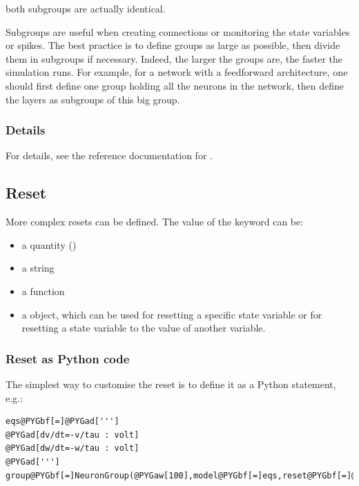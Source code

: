 \documentclass[letterpaper,10pt,english]{manual}
\begin{document}
both subgroups are actually identical.

Subgroups are useful when creating connections or monitoring the state variables or spikes.
The best practice is to define groups as large as possible, then divide them in subgroups if necessary.
Indeed, the larger the groups are, the faster the simulation runs. For example, for a network with a feedforward
architecture, one should first define one group holding all the neurons in the network, then define the layers as
subgroups of this big group.


\subsubsection{Details}

For details, see the reference documentation for \hyperlink{brian.NeuronGroup}{}.


\subsection{Reset}

More complex resets can be defined. The value of the  keyword can be:
\begin{itemize}
\item {} 
a quantity ()

\item {} 
a string

\item {} 
a function

\item {} 
a \hyperlink{brian.Reset}{} object, which can be used for resetting a specific state variable or
for resetting a state variable to the value of another variable.

\end{itemize}


\subsubsection{Reset as Python code}

The simplest way to customise the reset is to define it as a Python statement, e.g.:

\begin{Verbatim}[commandchars=@\[\]]
eqs@PYGbf[=]@PYGad[''']
@PYGad[dv/dt=-v/tau : volt]
@PYGad[dw/dt=-w/tau : volt]
@PYGad[''']
group@PYGbf[=]NeuronGroup(@PYGaw[100],model@PYGbf[=]eqs,reset@PYGbf[=]@PYGad["]@PYGad[v=0*mV;w+=3*mV]@PYGad["],threshold@PYGbf[=]@PYGaw[10]@PYGbf[*]mV)
\end{Verbatim}
\end{document}
